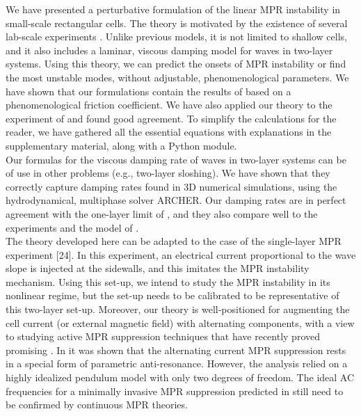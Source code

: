 \documentclass[aps,prfluids,reprint,superscriptaddress]{revtex4-2}
\begin{document}
We have presented a perturbative formulation of the linear MPR instability in small-scale rectangular cells. The theory is motivated by the existence of several lab-scale experiments \cite{Borisov2010,Pedcenko2009,LaRocca2002,Hegde2025}. Unlike previous models, it is not limited to shallow cells, and it also includes a laminar, viscous damping model for waves in two-layer systems. Using this theory, we can predict the onsets of MPR instability or find the most unstable modes, without adjustable, phenomenological parameters. We have shown that our formulations contain the results of \citet{Politis2021} based on a phenomenological friction coefficient. We have also applied our theory to the experiment of \citet{Borisov2010} and found good agreement. To simplify the calculations for the reader, we have gathered all the essential equations with explanations in the supplementary material, along with a Python module.
\\
\indent Our formulas for the viscous damping rate of waves in two-layer systems can be of use in other problems (e.g., two-layer sloshing). We have shown that they correctly capture damping rates found in 3D numerical simulations, using the hydrodynamical, multiphase solver ARCHER. Our damping rates are in perfect agreement with the one-layer limit of \citet{Keulegan1959}, and they also compare well to the experiments and the model of \citet{LaRocca2002}.
\\
\indent The theory developed here can be adapted to the case of the single-layer MPR experiment [24]. In this experiment, an electrical current proportional to the wave slope is injected at the sidewalls, and this imitates the MPR instability mechanism. Using this set-up, we intend to study the MPR instability in its nonlinear regime, but the set-up needs to be calibrated to be representative of this two-layer set-up. Moreover, our theory is well-positioned for augmenting the cell current (or external magnetic field) with alternating components, with a view to studying active MPR suppression techniques that have recently proved promising \cite{Mohammad2022}. In \citet{Horstmann2025} it was shown that the alternating current MPR suppression rests in a special form of parametric anti-resonance. However, the analysis relied on a highly idealized pendulum model with only two degrees of freedom. The ideal AC frequencies for a minimally invasive MPR suppression predicted in \cite{Horstmann2025} still need to be confirmed by continuous MPR theories.
\end{document}
